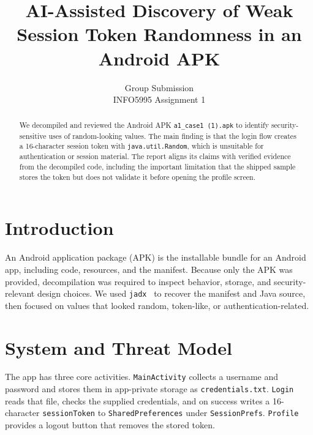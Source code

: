 \documentclass[letterpaper,twocolumn,10pt]{article}
\begin{document}
\date{}
\title{\Large \bf AI-Assisted Discovery of Weak Session Token Randomness in an Android APK}
\author{{\rm Group Submission}\\INFO5995 Assignment 1}
\maketitle

\begin{abstract}
We decompiled and reviewed the Android APK \texttt{a1\_case1 (1).apk} to identify security-sensitive uses of random-looking values. The main finding is that the login flow creates a 16-character session token with \texttt{java.util.Random}, which is unsuitable for authentication or session material. The report aligns its claims with verified evidence from the decompiled code, including the important limitation that the shipped sample stores the token but does not validate it before opening the profile screen.
\end{abstract}

\section{Introduction}
An Android application package (APK) is the installable bundle for an Android app, including code, resources, and the manifest. Because only the APK was provided, decompilation was required to inspect behavior, storage, and security-relevant design choices. We used \texttt{jadx}~\cite{jadx} to recover the manifest and Java source, then focused on values that looked random, token-like, or authentication-related.

\section{System and Threat Model}
The app has three core activities. \texttt{MainActivity} collects a username and password and stores them in app-private storage as \texttt{credentials.txt}. \texttt{Login} reads that file, checks the supplied credentials, and on success writes a 16-character \texttt{sessionToken} to \texttt{SharedPreferences} under \texttt{SessionPrefs}. \texttt{Profile} provides a logout button that removes the stored token.
\end{document}
